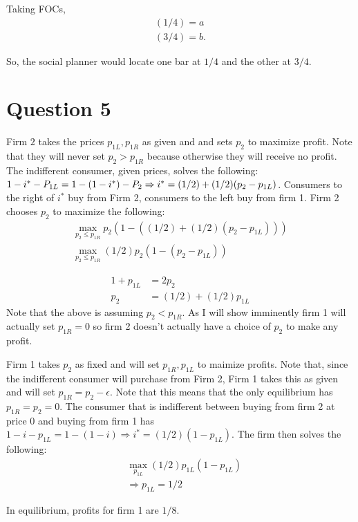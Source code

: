 \documentclass[11pt]{article} %
\begin{document}
Taking FOCs,
\begin{align*}
(1/4) = a \\
(3/4) = b. 
\end{align*}

So, the social planner would locate one bar at $1/4$ and the other at $3/4$.

\section{Question 5}
Firm $2$ takes the prices $p_{1L},p_{1R}$ as given and and sets $p_2$ to maximize profit. Note that they will never set $p_{2}>p_{1R}$ because otherwise they will receive no profit. The indifferent consumer, given prices, solves the following: $1 - i^{*} - P_{1L}  = 1 - (1- i^{*}) - P_2 \\ \Rightarrow i^{*} = (1/2) + (1/2)(p_2 - p_{1L})$. Consumers to the right of $i^{*} $ buy from Firm 2, consumers to the left buy from firm 1. Firm 2 chooses $p_2$ to maximize the following:
\begin{align*}
\max_{p_2\leq p_{1R}} p_2(1 - ((1/2) + (1/2)( p_2 - p_{1L}))) \\
\max_{p_2\leq p_{1R}} (1/2)p_2( 1 - ( p_2 - p_{1L})) 
\end{align*}

\begin{align*}
1 + p_{1L} &= 2p_2 \\
p_2 &= (1/2) + (1/2)p_{1L}
\end{align*}
Note that the above is assuming $p_2<p_{1R}$. As I will show imminently firm 1 will actually set $p_{1R} = 0$ so firm 2 doesn't actually have a choice of $p_2$ to make any profit.

Firm 1 takes $p_{2}$ as fixed and will set $p_{1R},p_{1L}$ to maimize profits. Note that, since the indifferent consumer will purchase from Firm 2, Firm 1 takes this as given and will set $p_{1R} = p_{2} - \epsilon$. Note that this means that the only equilibrium has $p_{1R} = p_{2} = 0$. The consumer that is indifferent between buying from firm 2 at price 0 and buying from firm 1 has $1 - i - p_{1L} = 1-(1-i) \Rightarrow i^{*} = (1/2)(1 - p_{1L})$. The firm then solves the following:
\begin{align*}
&\max_{p_{1L}} (1/2)p_{1L}(1-p_{1L}) \\
&\Rightarrow p_{1L} = 1/2 
\end{align*}

In equilibrium, profits for firm 1 are $1/8$.
\end{document}
